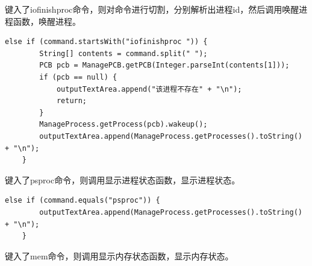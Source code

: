 \documentclass[UTF8,12pt]{article}
\begin{document}
键入了iofinishproc命令，则对命令进行切割，分别解析出进程id，然后调用唤醒进程函数，唤醒进程。

\begin{lstlisting}[title=键入iofinishproc,frame=shadowbox]
    else if (command.startsWith("iofinishproc ")) {
        String[] contents = command.split(" ");
        PCB pcb = ManagePCB.getPCB(Integer.parseInt(contents[1]));
        if (pcb == null) {
            outputTextArea.append("该进程不存在" + "\n");
            return;
        }
        ManageProcess.getProcess(pcb).wakeup();
        outputTextArea.append(ManageProcess.getProcesses().toString() + "\n");
    }
\end{lstlisting}

键入了psproc命令，则调用显示进程状态函数，显示进程状态。

\begin{lstlisting}[title=键入psproc,frame=shadowbox]
    else if (command.equals("psproc")) {
        outputTextArea.append(ManageProcess.getProcesses().toString() + "\n");
    }
\end{lstlisting}

键入了mem命令，则调用显示内存状态函数，显示内存状态。
\end{document}
